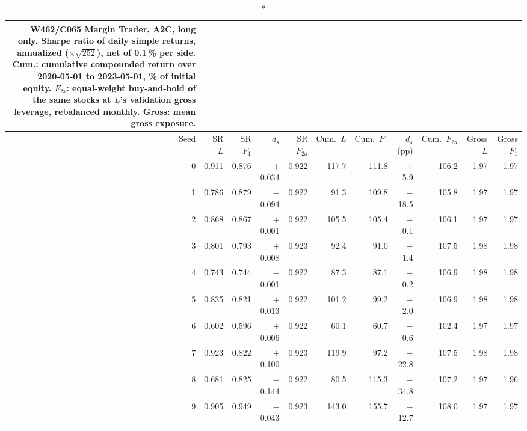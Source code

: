 \begin{longtable}{@{}rrrrrrrrrrr@{}}
\caption*{\small W462/C065 Margin Trader, A2C, long only. Sharpe ratio of daily simple returns, annualized ($\times\sqrt{252}$), net of 0.1\,\% per side. Cum.: cumulative compounded return over 2020-05-01 to 2023-05-01, \% of initial equity. $F_{2\mathrm{a}}$: equal-weight buy-and-hold of the same stocks at $L$'s validation gross leverage, rebalanced monthly. Gross: mean gross exposure.}\\
\toprule
Seed & SR $L$ & SR $F_1$ & $d_s$ & SR $F_{2\mathrm{a}}$ & Cum.\ $L$ & Cum.\ $F_1$ & $d_s$ (pp) & Cum.\ $F_{2\mathrm{a}}$ & Gross $L$ & Gross $F_1$\\ \midrule\endhead
0 & 0.911 & 0.876 & $+$0.034 & 0.922 & 117.7 & 111.8 & $+$5.9 & 106.2 & 1.97 & 1.97\\
1 & 0.786 & 0.879 & $-$0.094 & 0.922 & 91.3 & 109.8 & $-$18.5 & 105.8 & 1.97 & 1.97\\
2 & 0.868 & 0.867 & $+$0.001 & 0.922 & 105.5 & 105.4 & $+$0.1 & 106.1 & 1.97 & 1.97\\
3 & 0.801 & 0.793 & $+$0.008 & 0.923 & 92.4 & 91.0 & $+$1.4 & 107.5 & 1.98 & 1.98\\
4 & 0.743 & 0.744 & $-$0.001 & 0.922 & 87.3 & 87.1 & $+$0.2 & 106.9 & 1.98 & 1.98\\
5 & 0.835 & 0.821 & $+$0.013 & 0.922 & 101.2 & 99.2 & $+$2.0 & 106.9 & 1.98 & 1.98\\
6 & 0.602 & 0.596 & $+$0.006 & 0.922 & 60.1 & 60.7 & $-$0.6 & 102.4 & 1.97 & 1.97\\
7 & 0.923 & 0.822 & $+$0.100 & 0.923 & 119.9 & 97.2 & $+$22.8 & 107.5 & 1.98 & 1.98\\
8 & 0.681 & 0.825 & $-$0.144 & 0.922 & 80.5 & 115.3 & $-$34.8 & 107.2 & 1.97 & 1.96\\
9 & 0.905 & 0.949 & $-$0.043 & 0.923 & 143.0 & 155.7 & $-$12.7 & 108.0 & 1.97 & 1.97\\
\bottomrule\end{longtable}
